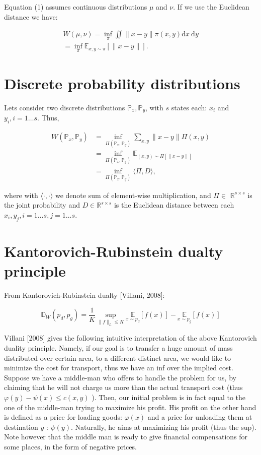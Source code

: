 \documentclass[10pt]{article}
\begin{document}
Equation (1) assumes continuous distributions $\mu$ and $\nu$. If we use the Euclidean distance we have:

$$
\begin{gathered}
W(\mu, \nu)=\inf _{\pi} \iint\|x-y\| \pi(x, y) \mathrm{d} x \mathrm{~d} y \\
=\inf _{\pi} \mathbb{E}_{x, y \sim \pi}[\|x-y\|] .
\end{gathered}
$$

\section*{Discrete probability distributions}
Lets consider two discrete distributions $\mathbb{P}_{x}, \mathbb{P}_{y}$, with $s$ states each: $x_{i}$ and $y_{i}, i=1 \ldots s$. Thus,

$$
\begin{aligned}
W\left(\mathbb{P}_{x}, \mathbb{P}_{y}\right) & =\inf _{\Pi\left(\mathbb{P}_{x}, \mathbb{P}_{y}\right)} \sum_{x, y}\|x-y\| \Pi(x, y) \\
& =\inf _{\Pi\left(\mathbb{P}_{x}, \mathbb{P}_{y}\right)} \mathbb{E}_{(x, y) \sim \Pi[\|x-y\|]} \\
& =\inf _{\Pi\left(\mathbb{P}_{x}, \mathbb{P}_{y}\right)}\langle\Pi, D\rangle,
\end{aligned}
$$

where with $\langle\cdot, \cdot\rangle$ we denote sum of element-wise multiplication, and $\Pi \in$ $\mathbb{R}^{s \times s}$ is the joint probability and $D \in \mathbb{R}^{s \times s}$ is the Euclidean distance between each $x_{i}, y_{j}, i=1 \ldots s, j=1 \ldots s$.

\section*{Kantorovich-Rubinstein dualty principle}
From Kantorovich-Rubinstein dualty [Villani, 2008]:

$$
\mathbb{D}_{W}\left(p_{d}, p_{g}\right)=\frac{1}{K} \sup _{\|f\|_{L} \leq K} \underset{x \sim p_{d}}{\mathbb{E}}[f(x)]-\underset{x \sim p_{g}}{\mathbb{E}}[f(x)]
$$

Villani [2008] gives the following intuitive interpretation of the above Kantorovich duality principle. Namely, if our goal is to transfer a huge
amount of mass distributed over certain area, to a different distinct area, we would like to minimize the cost for transport, thus we have an inf over the implied cost. Suppose we have a middle-man who offers to handle the problem for us, by claiming that he will not charge us more than the actual transport cost (thus $\varphi(y)-\psi(x) \leq c(x, y)$ ). Then, our initial problem is in fact equal to the one of the middle-man trying to maximize his profit. His profit on the other hand is defined as a price for loading goods: $\varphi(x)$ and a price for unloading them at destination $y$ : $\psi(y)$. Naturally, he aims at maximizing his profit (thus the sup). Note however that the middle man is ready to give financial compensations for some places, in the form of negative prices.
\end{document}

